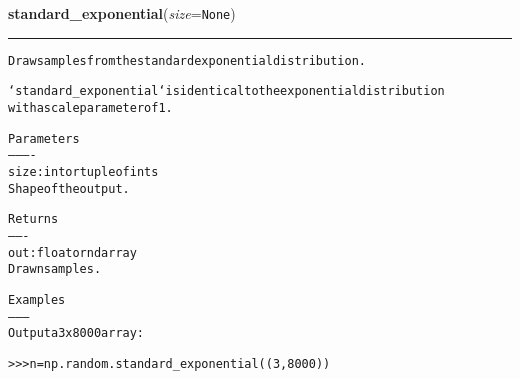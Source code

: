     \label{trunk:qstkutil:bollinger:standard_exponential}

    \vspace{0.5ex}

\hspace{.8\funcindent}\begin{boxedminipage}{\funcwidth}

    \raggedright \textbf{standard\_exponential}(\textit{size}={\tt None})

    \vspace{-1.5ex}

    \rule{\textwidth}{0.5\fboxrule}
\setlength{\parskip}{2ex}
\begin{alltt}
Draw samples from the standard exponential distribution.

`standard\_exponential` is identical to the exponential distribution
with a scale parameter of 1.

Parameters
----------
size : int or tuple of ints
    Shape of the output.

Returns
-------
out : float or ndarray
    Drawn samples.

Examples
--------
Output a 3x8000 array:

{\textgreater}{\textgreater}{\textgreater} n = np.random.standard\_exponential((3, 8000))
\end{alltt}

\setlength{\parskip}{1ex}
    \end{boxedminipage}

    \label{trunk:qstkutil:bollinger:standard_gamma}

    \vspace{0.5ex}

